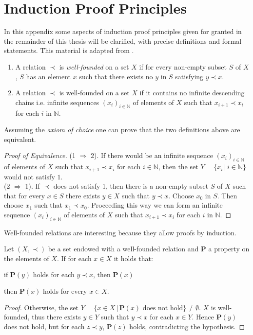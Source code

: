 \chapter{Induction Proof Principles}
In this appendix some aspects of induction proof principles given for granted in the remainder of this thesis will be clarified, with precise definitions and formal statements. This material is adapted from \cite{hrbacek_introduction_1999}.
\begin{definition}\hfill
	\begin{enumerate}
	\item A relation $\prec$ is \emph{well-founded} on a set $X$ if for every non-empty subset $S$ of $X$, $S$ has an  element $x$ such that there exists no $y$ in $S$ satisfying $y\prec x$.
	\item A relation $\prec$ is well-founded on a set $X$ if it contains no infinite descending chains i.e. infinite sequences $(x_i)_{i\in\mathbb{N}}$ of elements of $X$ such that $x_{i+1}\prec x_i$ for each $i$ in $\mathbb{N}$.
	\end{enumerate}
\end{definition}
Assuming the \emph{axiom of choice} one can prove that the two definitions above are equivalent.
\begin{proof}[Proof of Equivalence]
	(1 $\Rightarrow$ 2). If there would be an infinite sequence $(x_i)_{i\in\mathbb{N}}$ of elements of $X$ such that $x_{i+1}\prec x_i$ for each $i\in\mathbb{N}$, then the set $Y=\{x_i\,|\,i\in\mathbb{N}\}$ would not satisfy $1$.\\
	(2 $\Rightarrow$ 1). If $\prec$ does not satisfy 1, then there is a non-empty subset $S$ of $X$ such that for every $x\in S$ there exists $y\in X$ such that $y\prec x$. Choose $x_0$ in $S$. Then choose $x_1$ such that $x_1\prec x_0$. Proceeding this way we can form an infinite sequence $(x_i)_{i\in\mathbb{N}}$ of elements of $X$ such that $x_{i+1}\prec x_i$ for each $i$ in $\mathbb{N}$.
\end{proof}
Well-founded relations are interesting because they allow proofs by induction.
\begin{proposition}
	Let $(X,\prec)$ be a set endowed with a well-founded relation and $\mathbf{P}$ a property on the elements of $X$. If for each $x\in X$ it holds that: 
	\begin{center} if $\mathbf{P}(y)$ holds  for each $y\prec x$, then $\mathbf{P}(x)$\end{center}
	then $\mathbf{P}(x)$ holds for every $x\in X$.
\end{proposition}
\begin{proof}
	Otherwise, the set $Y=\{x\in X\,|\,\mathbf{P}(x)\textrm{ does not hold}\}\neq\emptyset$. $X$ is well-founded, thus there exists $y\in Y$ such that $y\prec x$ for each $x\in Y$. Hence $\mathbf{P}(y)$ does not hold, but for each $z\prec y$, $\mathbf{P}(z)$ holds, contradicting the hypothesis.
\end{proof}


